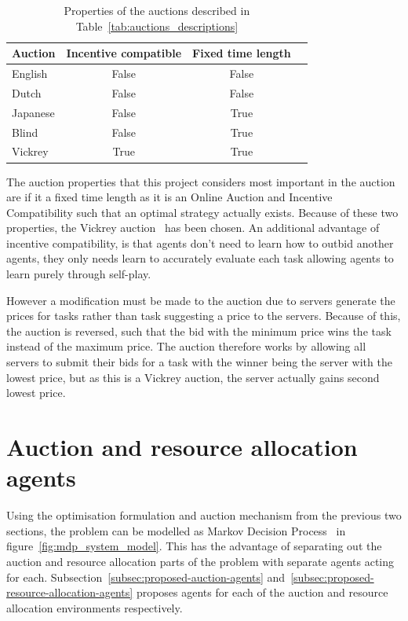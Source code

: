 \begin{table}[h]
    \centering
    \begin{tabular}{|l|c|c|c|} \hline
        \textbf{Auction}  & \textbf{Incentive compatible} & \textbf{Fixed time length} \\ \hline
        English           & False                         & False            \\ \hline
        Dutch             & False                         & False            \\ \hline
        Japanese          & False                         & True             \\ \hline
        Blind             & False                         & True             \\ \hline
        Vickrey           & True                          & True             \\ \hline
    \end{tabular}
    \caption{Properties of the auctions described in Table~\ref{tab:auctions_descriptions}}
    \label{tab:auction_properties}
\end{table}

The auction properties that this project considers most important in the auction are if it a fixed time length as it is
an Online Auction and Incentive Compatibility such that an optimal strategy actually exists. Because of these two
properties, the Vickrey auction~\citep{vickrey} has been chosen. An additional advantage of incentive compatibility,
is that agents don't need to learn how to outbid another agents, they only needs learn to accurately evaluate each
task allowing agents to learn purely through self-play.

However a modification must be made to the auction due to servers generate the prices for tasks rather than task
suggesting a price to the servers. Because of this, the auction is reversed, such that the bid with the minimum price
wins the task instead of the maximum price. The auction therefore works by allowing all servers to submit their bids for
a task with the winner being the server with the lowest price, but as this is a Vickrey auction, the server actually
gains second lowest price.

\section{Auction and resource allocation agents}\label{sec:proposed-agents}
Using the optimisation formulation and auction mechanism from the previous two sections, the problem can be modelled as
Markov Decision Process~\citep{Bel} in figure~\ref{fig:mdp_system_model}. This has the advantage of separating out the
auction and resource allocation parts of the problem with separate agents acting for each.
Subsection~\ref{subsec:proposed-auction-agents} and~\ref{subsec:proposed-resource-allocation-agents} proposes agents
for each of the auction and resource allocation environments respectively.

